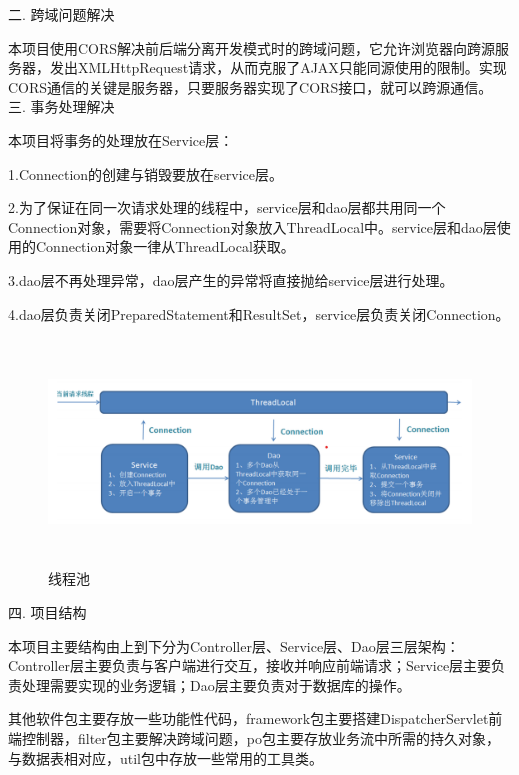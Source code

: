 \noindent
二. 跨域问题解决

本项目使用CORS解决前后端分离开发模式时的跨域问题，它允许浏览器向跨源服务器，发出XMLHttpRequest请求，从而克服了AJAX只能同源使用的限制。实现CORS通信的关键是服务器，只要服务器实现了CORS接口，就可以跨源通信。~\\

\noindent
三. 事务处理解决

本项目将事务的处理放在Service层：

1.Connection的创建与销毁要放在service层。

2.为了保证在同一次请求处理的线程中，service层和dao层都共用同一个Connection对象，需要将Connection对象放入ThreadLocal中。service层和dao层使用的Connection对象一律从ThreadLocal获取。

3.dao层不再处理异常，dao层产生的异常将直接抛给service层进行处理。

4.dao层负责关闭PreparedStatement和ResultSet，service层负责关闭Connection。

\begin{figure}[H]
    \centering
    \includegraphics[width=15cm,height=6cm]{figures/thread.png}
    \caption{线程池}
\end{figure}

\noindent
四. 项目结构

本项目主要结构由上到下分为Controller层、Service层、Dao层三层架构：Controller层主要负责与客户端进行交互，接收并响应前端请求；Service层主要负责处理需要实现的业务逻辑；Dao层主要负责对于数据库的操作。

其他软件包主要存放一些功能性代码，framework包主要搭建DispatcherServlet前端控制器，filter包主要解决跨域问题，po包主要存放业务流中所需的持久对象，与数据表相对应，util包中存放一些常用的工具类。

